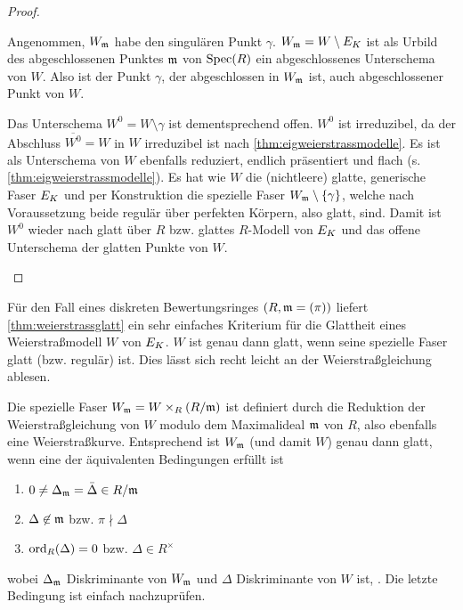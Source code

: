 \begin{Lemma}
\begin{proof}
\begin{enumerate}[label=(\alph*)]
      Angenommen, $W_{\mathfrak{m}}$ habe den singulären Punkt $\gamma$.
      $W_{\mathfrak{m}}=W\setminus E_{K}$ ist als Urbild des abgeschlossenen Punktes
      $\mathfrak{m}$ von $\operatorname{Spec}(R)$ ein abgeschlossenes Unterschema von $W$.
      Also ist der Punkt $\gamma$, der abgeschlossen in $W_{\mathfrak{m}}$ ist, auch
      abgeschlossener Punkt von $W$.
      
      Das Unterschema $W^0=W\setminus\gamma$ ist dementsprechend offen.
      $W^0$ ist irreduzibel, da der Abschluss $\overline{W^0}=W$ in
      $W$ irreduzibel ist nach \ref{thm:eigweierstrassmodelle}.
      Es ist als Unterschema von $W$ ebenfalls reduziert, endlich
      präsentiert und flach (s. \ref{thm:eigweierstrassmodelle}).
      Es hat wie $W$ die (nichtleere) glatte, generische Faser $E_{K}$ und
      per Konstruktion die spezielle Faser $W_{\mathfrak{m}}\setminus\{\gamma\}$,
      welche nach Voraussetzung beide regulär über perfekten Körpern,
      also glatt, sind.
      Damit ist $W^0$ wieder nach \cite[8.5, Proposition 17]{bosch}
      glatt über $R$ bzw. glattes $R$-Modell von $E_{K}$ und das offene
      Unterschema der glatten Punkte von $W$.
    \end{enumerate}
  \end{proof}
\end{Lemma}

\begin{Bemerkung}\label{thm:weierstraßmodellglatt}
  Für den Fall eines diskreten Bewertungsringes $(R,\mathfrak{m}=(\pi))$ liefert
  \ref{thm:weierstrassglatt} ein sehr einfaches Kriterium für die
  Glattheit eines Weierstraßmodell $W$ von $E_{K}$.
  $W$ ist genau dann glatt, wenn seine spezielle Faser glatt
  (bzw. regulär) ist.
  Dies lässt sich recht leicht an der Weierstraßgleichung ablesen.
  
  Die spezielle Faser $W_{\mathfrak{m}}=W\times_R (R/\mathfrak{m})$ ist definiert
  durch die Reduktion der Weierstraßgleichung von $W$ modulo dem
  Maximalideal $\mathfrak{m}$ von $R$, also ebenfalls eine Weierstraßkurve.
  Entsprechend ist $W_{\mathfrak{m}}$ (und damit $W$) genau dann glatt, wenn
  eine der äquivalenten Bedingungen erfüllt ist
  \begin{enumerate}[label=(\roman*)]
  \item $0\neq\Delta_{\mathfrak{m}}=\bar\Delta\in R/\mathfrak{m}$
  \item $\Delta\not\in\mathfrak{m}$ bzw. $\pi\nmid\Delta$
  \item $\operatorname{ord}_R(\Delta)=0$ bzw. $\Delta\in R^\times$
  \end{enumerate}
  wobei $\Delta_{\mathfrak{m}}$ Diskriminante von $W_{\mathfrak{m}}$ und $\Delta$
  Diskriminante von $W$ ist,
  \cite[vgl.][Proposition VII.5.1 (a)]{silverman}.
  Die letzte Bedingung ist einfach nachzuprüfen.
\end{Bemerkung}


